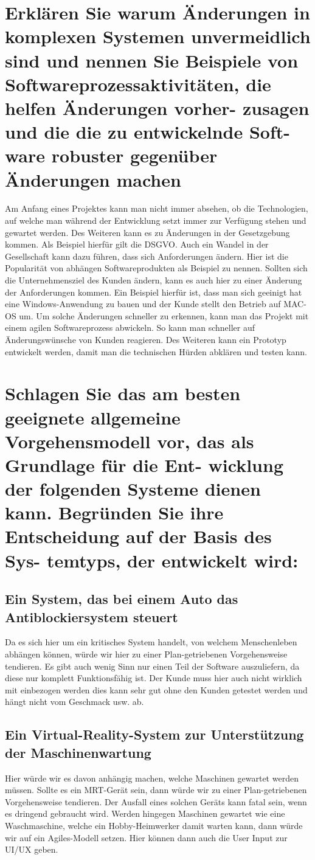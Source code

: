 \documentclass[12pt]{article}
\begin{document}
\section{Erklären Sie warum Änderungen in komplexen Systemen unvermeidlich sind und nennen Sie Beispiele
von Softwareprozessaktivitäten, die helfen Änderungen vorher- zusagen und die die zu entwickelnde Soft-
ware robuster gegenüber Änderungen machen}
Am Anfang eines Projektes kann man nicht immer absehen, ob die Technologien, auf welche man während der Entwicklung setzt immer zur Verfügung stehen und gewartet werden. Des Weiteren kann es zu Änderungen in der Gesetzgebung kommen. Als Beispiel hierfür gilt die DSGVO. Auch ein Wandel in der Gesellschaft kann dazu führen, dass sich Anforderungen ändern. Hier ist die Popularität von abhängen Softwareprodukten als Beispiel zu nennen. Sollten sich die Unternehmensziel des Kunden ändern, kann es auch hier zu einer Änderung der Anforderungen kommen. Ein Beispiel hierfür ist, dass man sich geeinigt hat eine Windows-Anwendung zu bauen und der Kunde stellt den Betrieb auf MAC-OS um.
Um solche Änderungen schneller zu erkennen, kann man das Projekt mit einem agilen Softwareprozess abwickeln. So kann man schneller auf Änderungswünsche von Kunden reagieren. Des Weiteren kann ein Prototyp entwickelt werden, damit man die technischen Hürden abklären und testen kann.
\section{Schlagen Sie das am besten geeignete allgemeine Vorgehensmodell vor, das als Grundlage für die Ent-
wicklung der folgenden Systeme dienen kann. Begründen Sie ihre Entscheidung auf der Basis des Sys-
temtyps, der entwickelt wird:}
\subsection{Ein System, das bei einem Auto das Antiblockiersystem steuert}
Da es sich hier um ein kritisches System handelt, von welchem Menschenleben abhängen können, würde wir hier zu einer Plan-getriebenen Vorgehensweise tendieren.
Es gibt auch wenig Sinn nur einen Teil der Software auszuliefern, da diese nur komplett Funktionsfähig ist. Der Kunde muss hier auch nicht wirklich mit einbezogen werden dies kann sehr gut ohne den Kunden getestet werden und hängt nicht vom Geschmack usw. ab.
\subsection{Ein Virtual-Reality-System zur Unterstützung der Maschinenwartung}
Hier würde wir es davon anhängig machen, welche Maschinen gewartet werden müssen. Sollte es ein MRT-Gerät sein, dann würde wir zu einer Plan-getriebenen Vorgehensweise tendieren.
Der Ausfall eines solchen Geräts kann fatal sein, wenn es dringend gebraucht wird. Werden hingegen Maschinen gewartet wie eine Waschmaschine, welche ein Hobby-Heimwerker damit warten kann, dann würde wir auf ein Agiles-Modell setzen. Hier können dann auch die User Input zur UI/UX geben.
\end{document}
